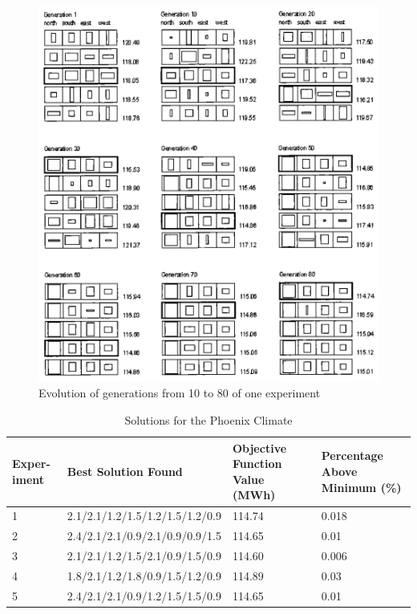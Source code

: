 \begin{figure}[htbp]
\centering
\includegraphics[width=\textwidth]{./Images/23-Gen10-80}
\caption[Generations Evolution]{Evolution of generations from 10 to 80 of one experiment \cite{caldas01}}
\label{fig:GenEvol}
\end{figure}

\begin{table}[h]
\centering
\begin{tabular}{|p{1.5cm}|p{6cm}|p{2cm}|p{2.2cm}|}
\hline
\textbf{Exper-\newline iment}&\textbf{Best Solution Found}&\textbf{Objective Function Value (MWh)}&\textbf{Percentage Above Minimum (\%)}\\ \hline
1&2.1/2.1/1.2/1.5/1.2/1.5/1.2/0.9&114.74&0.018\\ \hline
2&2.4/2.1/2.1/0.9/2.1/0.9/0.9/1.5&114.65&0.01\\ \hline
3&2.1/2.1/1.2/1.5/2.1/0.9/1.5/0.9&114.60&0.006\\ \hline
4&1.8/2.1/1.2/1.8/0.9/1.5/1.2/0.9&114.89&0.03\\ \hline
5&2.4/2.1/2.1/0.9/1.2/1.5/1.5/0.9&114.65&0.01\\ \hline
\end{tabular}
\label{tab:PhoenixSolutions}
\caption[Solutions for the Phoenix Climate]{Solutions for the Phoenix Climate \cite{caldas01}}
\end{table}

